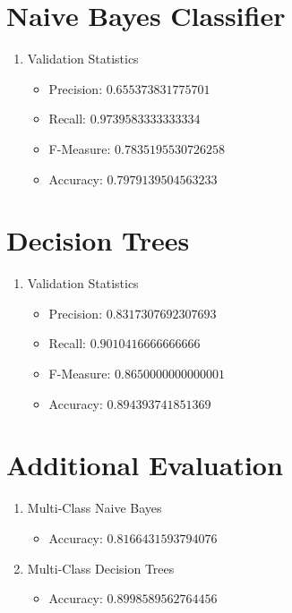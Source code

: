 \documentclass[12pt]{article}
\begin{document}
\newpage
\section{Naive Bayes Classifier}\label{naive}

\begin{enumerate}
    \item Validation Statistics
    \begin{itemize}
        \item Precision: $0.655373831775701$
        \item Recall: $0.9739583333333334$
        \item F-Measure: $0.7835195530726258$
        \item Accuracy: $0.7979139504563233$
    \end{itemize}
\end{enumerate}

\section{Decision Trees}\label{naive}

\begin{enumerate}
    \item Validation Statistics
    \begin{itemize}
        \item Precision: $0.8317307692307693$
        \item Recall: $0.9010416666666666$
        \item F-Measure: $0.8650000000000001$
        \item Accuracy: $0.894393741851369$
    \end{itemize}
\end{enumerate}

\section{Additional Evaluation}

\begin{enumerate}
    \item Multi-Class Naive Bayes
    \begin{itemize}
        \item Accuracy: $0.8166431593794076$
    \end{itemize}
    \item Multi-Class Decision Trees
    \begin{itemize}
        \item Accuracy: $0.8998589562764456$
    \end{itemize}
\end{enumerate}
\end{document}
